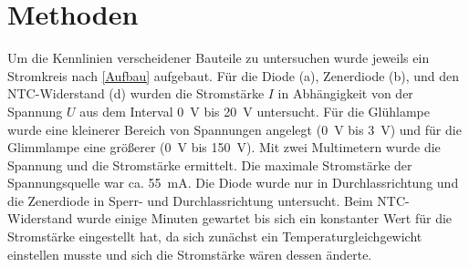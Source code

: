 \documentclass[
	a4paper,
	12pt,
	pagesize,
	ngerman
]{scrartcl}
\begin{document}
	
	\section{Methoden}
	Um die Kennlinien verscheidener Bauteile zu untersuchen wurde jeweils ein Stromkreis nach \cref{Aufbau} aufgebaut.
	Für die Diode (a), Zenerdiode (b), und den NTC-Widerstand (d) wurden die Stromstärke $I$ in Abhängigkeit von der Spannung $U$ aus dem Interval \SI{0}{V} bis \SI{20}{V} untersucht. 
	Für die Glühlampe wurde eine kleinerer Bereich von Spannungen angelegt (\SI{0}{V} bis \SI{3}{V}) und für die Glimmlampe eine größerer (\SI{0}{V} bis \SI{150}{V}).
	Mit zwei Multimetern wurde die Spannung und die Stromstärke ermittelt.
	Die maximale Stromstärke der Spannungsquelle war ca. \SI{55}{mA}.
	Die Diode wurde nur in Durchlassrichtung und die Zenerdiode in Sperr- und Durchlassrichtung untersucht.
	Beim NTC-Widerstand wurde einige Minuten gewartet bis sich ein konstanter Wert für die Stromstärke eingestellt hat, da sich zunächst ein Temperaturgleichgewicht einstellen musste und sich die Stromstärke wären dessen änderte.
\end{document}
